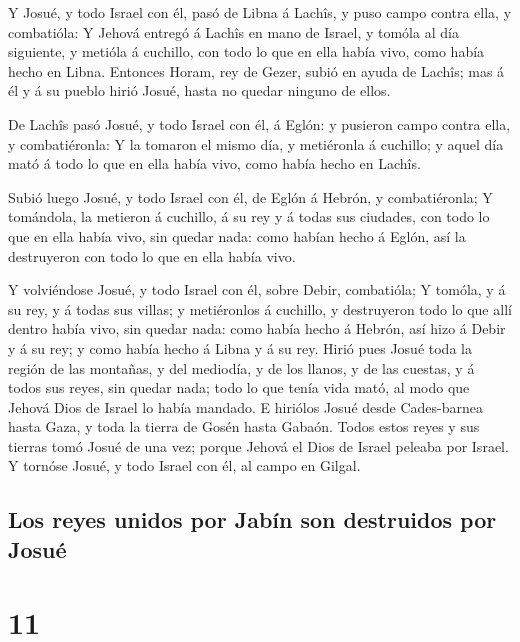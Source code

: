  Y Josué, y todo Israel con él, pasó de Libna á Lachîs, y
puso campo contra ella, y combatióla:  Y Jehová entregó á
Lachîs en mano de Israel, y tomóla al día siguiente, y metióla á
cuchillo, con todo lo que en ella había vivo, como había hecho en Libna.
 Entonces Horam, rey de Gezer, subió en ayuda de Lachîs;
mas á él y á su pueblo hirió Josué, hasta no quedar ninguno de ellos.

 De Lachîs pasó Josué, y todo Israel con él, á Eglón: y
pusieron campo contra ella, y combatiéronla:  Y la
tomaron el mismo día, y metiéronla á cuchillo; y aquel día mató á todo
lo que en ella había vivo, como había hecho en Lachîs.

 Subió luego Josué, y todo Israel con él, de Eglón á
Hebrón, y combatiéronla;  Y tomándola, la metieron á
cuchillo, á su rey y á todas sus ciudades, con todo lo que en ella había
vivo, sin quedar nada: como habían hecho á Eglón, así la destruyeron con
todo lo que en ella había vivo.

 Y volviéndose Josué, y todo Israel con él, sobre Debir,
combatióla;  Y tomóla, y á su rey, y á todas sus villas;
y metiéronlos á cuchillo, y destruyeron todo lo que allí dentro había
vivo, sin quedar nada: como había hecho á Hebrón, así hizo á Debir y á
su rey; y como había hecho á Libna y á su rey.  Hirió
pues Josué toda la región de las montañas, y del mediodía, y de los
llanos, y de las cuestas, y á todos sus reyes, sin quedar nada; todo lo
que tenía vida mató, al modo que Jehová Dios de Israel lo había mandado.
 E hiriólos Josué desde Cades-barnea hasta Gaza, y toda
la tierra de Gosén hasta Gabaón.  Todos estos reyes y sus
tierras tomó Josué de una vez; porque Jehová el Dios de Israel peleaba
por Israel.  Y tornóse Josué, y todo Israel con él, al
campo en Gilgal.

\hypertarget{los-reyes-unidos-por-jabuxedn-son-destruidos-por-josuuxe9}{%
\subsection{Los reyes unidos por Jabín son destruidos por
Josué}\label{los-reyes-unidos-por-jabuxedn-son-destruidos-por-josuuxe9}}

\hypertarget{section-10}{%
\section{11}\label{section-10}}

